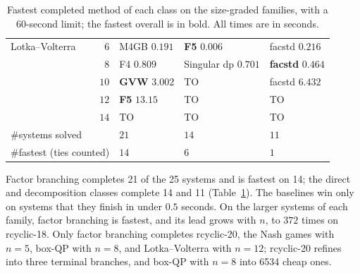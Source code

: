 \begin{table}[pos=htbp]
{\begin{tabular}{l r l l l}
      \hline
      Lotka--Volterra & $6$ & M4GB $0.191$ & \textbf{F5}
      $\mathbf{0.006}$ & facstd $0.216$ \\
      & $8$ & F4 $0.809$ & Singular dp $0.701$ &
      \textbf{facstd} $\mathbf{0.464}$ \\
      & $10$ & \textbf{GVW} $\mathbf{3.002}$ &
      TO & facstd $6.432$ \\
      & $12$ & \textbf{F5} $\mathbf{13.15}$ &
      TO & TO \\
      & $14$ & TO & TO & TO \\
      \hline
      \multicolumn{2}{l}{\#systems solved} & $21$ & $14$ & $11$ \\
      \multicolumn{2}{l}{\#fastest (ties counted)} & $14$ & $6$ & $1$ \\
      \hline
    \end{tabular}%
  }
  \caption{Fastest completed method of each class on the size-graded
    families, with a 60-second limit; the fastest overall is in bold. All
  times are in seconds.}
  \label{tab:scaling-classes}
\end{table}

Factor branching completes 21 of the 25 systems and is fastest on 14; the
direct and decomposition classes complete 14 and 11
(Table~\ref{tab:scaling-classes}). The baselines win only on systems that they
finish in under $0.5$ seconds. On the larger systems of each family, factor
branching is fastest, and its lead grows with $n$, to $372$ times on
rcyclic-18. Only factor branching completes rcyclic-20, the Nash games with
$n=5$, box-QP with $n=8$, and Lotka--Volterra with $n=12$; rcyclic-20 refines
into three terminal branches, and box-QP with $n=8$ into 6534 cheap ones.


